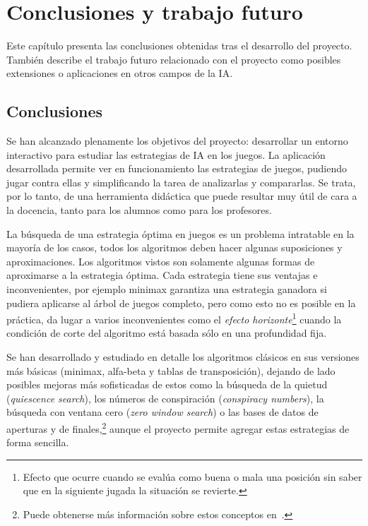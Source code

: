 \chapter{Conclusiones y trabajo futuro}
\label{cap:conclusiones}
Este capítulo presenta las conclusiones obtenidas tras el desarrollo del proyecto.
También describe el trabajo futuro relacionado con el proyecto como posibles extensiones o aplicaciones en otros campos de la IA.

\section{Conclusiones}
\label{sec:conclusiones}
Se han alcanzado plenamente los objetivos del proyecto: desarrollar un entorno interactivo para estudiar las estrategias de IA en los juegos.
La aplicación desarrollada permite ver en funcionamiento las estrategias de juegos, pudiendo jugar contra ellas y simplificando la tarea de analizarlas y compararlas.
Se trata, por lo tanto, de una herramienta didáctica que puede resultar muy útil de cara a la docencia, tanto para los alumnos como para los profesores.

La búsqueda de una estrategia óptima en juegos es un problema intratable en la mayoría de los casos, todos los algoritmos deben hacer algunas suposiciones y aproximaciones.
Los algoritmos vistos son solamente algunas formas de aproximarse a la estrategia óptima.
Cada estrategia tiene sus ventajas e inconvenientes, por ejemplo minimax garantiza una estrategia ganadora si pudiera aplicarse al árbol de juegos completo, pero como esto no es posible en la práctica, da lugar a varios inconvenientes como el \textit{efecto horizonte}\footnote{Efecto que ocurre cuando se evalúa como buena o mala una posición sin saber que en la siguiente jugada la situación se revierte.} cuando la condición de corte del algoritmo está basada sólo en una profundidad fija.

Se han desarrollado y estudiado en detalle los algoritmos clásicos en sus versiones más básicas (minimax, alfa-beta y tablas de transposición), dejando de lado posibles mejoras más sofisticadas de estos como la búsqueda de la quietud (\textit{quiescence search}), los números de conspiración (\textit{conspiracy numbers}), la búsqueda con ventana cero (\textit{zero window search}) o las bases de datos de aperturas y de finales,\footnote{Puede obtenerse más información sobre estos conceptos en~.} aunque el proyecto permite agregar estas estrategias de forma sencilla.

